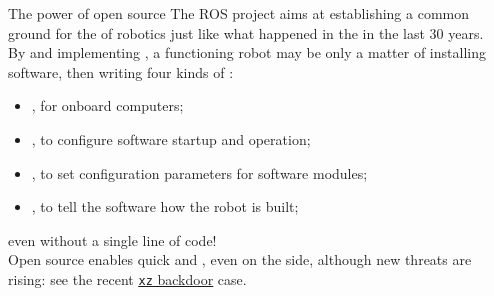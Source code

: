 \begin{frame}{The power of open source}
	The ROS project aims at establishing a common ground for the  of robotics just like what happened in the  in the last 30 years.\\
	\bigskip
	By  and implementing ,  a functioning robot may be only a matter of installing software, then writing four kinds of :
	\begin{itemize}
		\item {}, for onboard computers;
		\item {}, to configure software startup and operation;
		\item {}, to set configuration parameters for software modules;
		\item {}, to tell the software how the robot is built;
	\end{itemize}
	even without a single line of code!\\
	\bigskip
	Open source enables quick  and , even on the  side, although new threats are rising: see the recent \href{https://en.wikipedia.org/wiki/XZ_Utils_backdoor}{\color{blue}\underline{\texttt{xz} backdoor}} case.
\end{frame}

